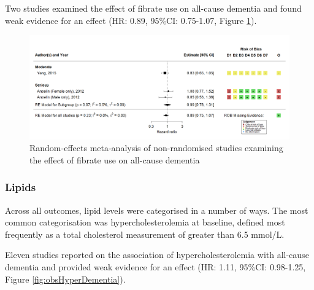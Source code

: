 \documentclass[a4paper, twoside]{templates/ociamthesis}
\begin{document}
Two studies examined the effect of fibrate use on all-cause dementia and found weak evidence for an effect (HR: 0.89, 95\%CI: 0.75-1.07, Figure \ref{fig:obsFibrateDementiaFig}).





\begin{figure}[H]
\includegraphics[width=1\linewidth]{figures/sys-rev/fp_obs_Fibrate_Dementia} \caption[Random-effects meta-analysis of statins on all-cause dementia]{Random-effects meta-analysis of non-randomised studies examining the effect of fibrate use on all-cause dementia}\label{fig:obsFibrateDementiaFig}
\end{figure}

\hypertarget{lipids}{%
\subsubsection{Lipids}\label{lipids}}

Across all outcomes, lipid levels were categorised in a number of ways. The most common categorisation was hypercholesterolemia at baseline, defined most frequently as a total cholesterol measurement of greater than 6.5 mmol/L.

Eleven studies reported on the association of hypercholesterolemia with all-cause dementia and provided weak evidence for an effect (HR: 1.11, 95\%CI: 0.98-1.25, Figure \ref{fig:obsHyperDementia}).
\end{document}
